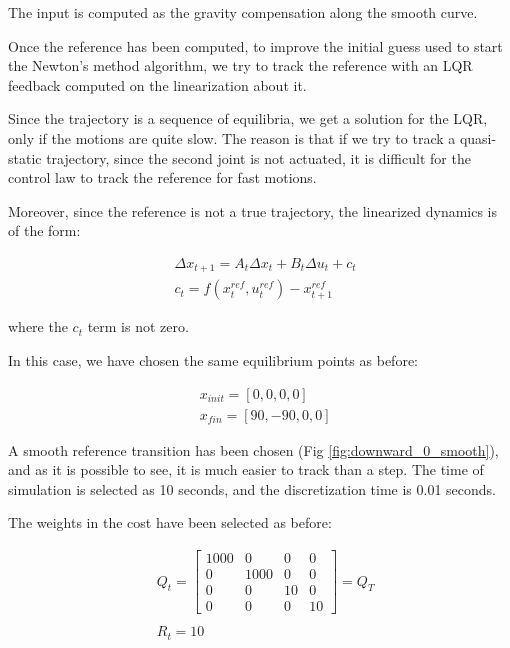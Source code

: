 The input is computed as the gravity compensation along the smooth curve.

Once the reference has been computed, to improve the initial guess used to start the Newton's method algorithm, we try to track the reference with an LQR feedback computed on the linearization about it.

Since the trajectory is a sequence of equilibria, we get a solution for the LQR, only if the motions are quite slow. The reason is that if we try to track a quasi-static trajectory, since the second joint is not actuated, it is difficult for the control law to track the reference for fast motions.

Moreover, since the reference is not a true trajectory, the linearized dynamics is of the form:

\begin{equation}
\begin{aligned}
       &\Delta x_{t+1} = A_t \Delta x_t + B_t \Delta u_t + c_t \\
       & c_t = f(x^{ref}_t,u^{ref}_t) - x^{ref}_{t+1}
\end{aligned}    
\end{equation}

where the $c_t$ term is not zero.

In this case, we have chosen the same equilibrium points as before:

\begin{equation*}
\begin{aligned}
    &x_{init} = [0,0,0,0] \\
    &x_{fin} = [90,-90,0,0]
\end{aligned}  
\end{equation*}

A smooth reference transition has been chosen (Fig \ref{fig:downward_0_smooth}), and as it is possible to see, it is much easier to track than a step. The time of simulation is selected as 10 seconds, and the discretization time is 0.01 seconds.

The weights in the cost have been selected as before:

\begin{equation*}
    \begin{aligned}
        &Q_t = \begin{bmatrix}
            1000 & 0 & 0 & 0 \\
            0 & 1000 & 0 & 0 \\
            0 & 0 & 10 & 0\\
            0 & 0 & 0 & 10
        \end{bmatrix} = Q_T\\
        &\\
    & R_t = 10
    \end{aligned}
\end{equation*}

